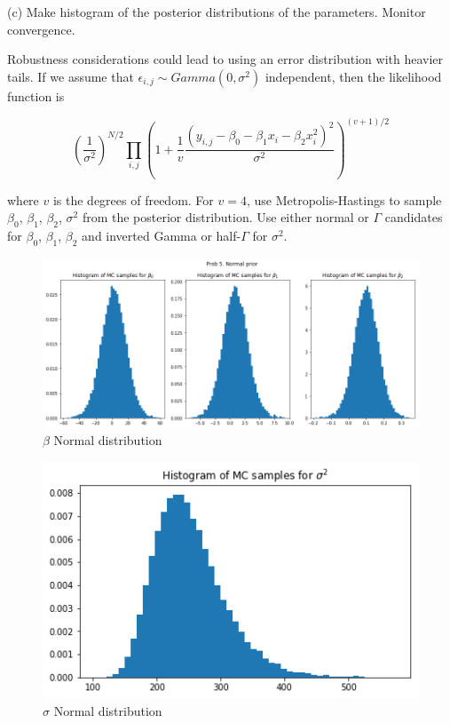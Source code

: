 \documentclass{article}
\begin{document}
(c) Make histogram of the posterior distributions of the parameters. Monitor convergence.

Robustness considerations could lead to using an error distribution with heavier tails. If we assume that $\epsilon_{i,j} \sim Gamma(0,\sigma^{2})$ independent, then the likelihood function is 

\begin{equation}
    (\frac{1}{\sigma^2})^{N/2} \prod_{i,j} (1+\frac{1}{v} \frac{(y_{i,j}-\beta_{0}-\beta_{1}x_{i}-\beta_{2}x_{i}^{2})^2}{\sigma^2})^{(v+1)/2}
\end{equation}

where $v$ is the degrees of freedom. For $v=4$, use Metropolis-Hastings to sample  $\beta_{0}$, $\beta_{1}$, $\beta_{2}$, $\sigma^{2}$ from the posterior distribution. Use either normal or $\Gamma$ candidates for $\beta_{0}$, $\beta_{1}$, $\beta_{2}$ and inverted Gamma or half-$\Gamma$ for $\sigma^2$.

\begin{figure}[h!]
\centering
\includegraphics[scale=0.45]{HW4P51.png}
\caption{$\beta$ Normal distribution}
\end{figure}

\begin{figure}[h!]
\centering
\includegraphics[scale=0.45]{HW4P52.png}
\caption{$\sigma$ Normal distribution}
\end{figure}
\end{document}
